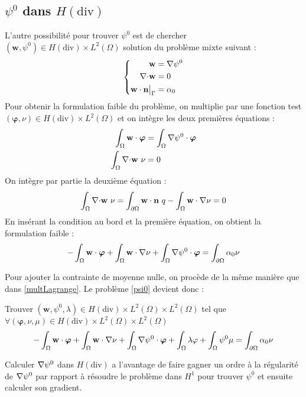 \subsection{$\psi^0$ dans $H(\mathrm{div})$}

L'autre possibilité pour trouver $\psi^0$ est de chercher $(\mathbf{w},\psi^0)\in H(\mathrm{div})\times L^2(\Omega)$ solution du problème mixte suivant :
\begin{equation*}
\left\{\begin{aligned}
\mathbf{w} &= {\nabla} \psi^0\\
{\nabla\cdot} \mathbf{w} &= 0\\
\mathbf{w}\cdot \mathbf{n}{\big\rvert_{\Gamma}} &= \alpha_0
\end{aligned}\right.
\end{equation*}
Pour obtenir la formulation faible du problème, on multiplie par une fonction test $(\bm{\varphi},\nu)\in H(\mathrm{div})\times L^2(\Omega)$ et on intègre les deux premières équations :
\begin{align*}
\int_\Omega \mathbf{w}\cdot\bm{\varphi} &= \int_\Omega {\nabla}\psi^0\cdot\bm{\varphi}\\
\int_\Omega {\nabla\cdot} \mathbf{w}\ \nu &= 0
\end{align*}
On intègre par partie la deuxième équation :
\[ \int_\Omega {\nabla\cdot} \mathbf{w}\ \nu = \int_{\partial\Omega} \mathbf{w}\cdot \mathbf{n}\ q - \int_\Omega \mathbf{w}\cdot{\nabla}\nu = 0  \]
En insérant la condition au bord et la première équation, on obtient la formulation faible :
\[ -\int_\Omega \mathbf{w}\cdot\bm{\varphi} + \int_\Omega \mathbf{w}\cdot{\nabla}\nu + \int_\Omega {\nabla}\psi^0\cdot\bm{\varphi}  = \int_{\partial\Omega} \alpha_0\nu \]

Pour ajouter la contrainte de moyenne nulle, on procède de la même manière que dans \ref{multLagrange}. Le problème \ref{psi0} devient donc :
\begin{pb}\label{fvpsidiv}
Trouver $(\mathbf{w},\psi^0,\lambda)\in H(\mathrm{div})\times L^2(\Omega)\times L^2(\Omega)$ tel que $\forall (\bm{\varphi},\nu,\mu)\in H(\mathrm{div})\times L^2(\Omega)\times L^2(\Omega)$
\begin{equation*}
-\int_\Omega \mathbf{w}\cdot\bm{\varphi} + \int_\Omega \mathbf{w}\cdot{\nabla}\nu + \int_\Omega {\nabla}\psi^0\cdot\bm{\varphi} + \int_\Omega \lambda\varphi + \int_\Omega \psi^0\mu = \int_{\partial\Omega} \alpha_0\nu
\end{equation*}\end{pb}

\begin{rk}
Calculer ${\nabla}\psi^0$ dans $H(\mathrm{div})$ a l'avantage de faire gagner un ordre à la régularité de ${\nabla}\psi^0$ par rapport à résoudre le problème dans $H^1$ pour trouver $\psi^0$ et ensuite calculer son gradient.
\end{rk}

